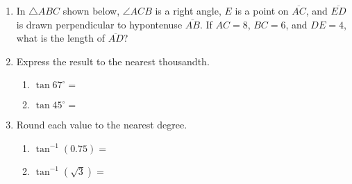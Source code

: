 \documentclass[12pt, twoside]{article}
\begin{document}
\begin{enumerate}
\item In $\triangle ABC$ shown below, $\angle ACB$ is a right angle, $E$ is a point on $\overline{AC}$, and $\overline{ED}$ is drawn perpendicular to hypontenuse $\overline{AB}$. If $AC = 8$, $BC = 6$, and $DE = 4$, what is the length of $\overline{AD}$? 
\begin{flushright}
\end{flushright} 

\newpage
\item Express the result to the nearest thousandth.  \vspace{.5cm}
    \begin{multicols}{2}
      \begin{enumerate}
        \item $\tan 67^\circ = $ \vspace{1cm}
        \item $\tan 45^\circ =$
      \end{enumerate}
    \end{multicols} \vspace{1cm}

    \item Round each value to the nearest degree.  \vspace{.5cm}
    \begin{multicols}{2}
      \begin{enumerate}
        \item $\tan^{-1} (0.75) = $ \vspace{1cm}
        \item $\tan^{-1} (\sqrt{3}) =$
      \end{enumerate}
    \end{multicols} \vspace{1cm}


\end{enumerate}
\end{document}

